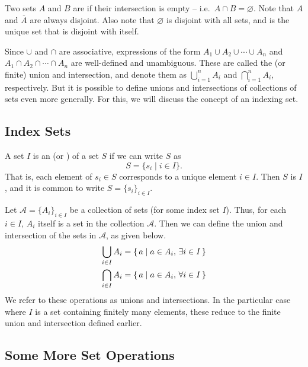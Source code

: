 Two sets $A$ and $B$ are  if their intersection is empty -- i.e.\ $A \cap B = \varnothing$. Note that $A$ and $\overline A$ are always disjoint. Also note that $\varnothing$ is disjoint with all sets, and is the unique set that is disjoint with itself.

Since $\cup$ and $\cap$ are associative, expressions of the form $A_1 \cup A_2 \cup \cdots \cup A_n$ and $A_1 \cap A_2 \cap \cdots \cap A_n$ are well-defined and unambiguous. These are called the  (or finite) union and intersection, and denote them as $\bigcup_{i=1}^n A_i$ and $\bigcap_{i=1}^n A_i$, respectively. But it is possible to define unions and intersections of collections of sets even more generally. For this, we will discuss the concept of an indexing set.

\subsection{Index Sets}\label{subsec:IndexSets}

A set $I$ is an  (or ) of a set $S$ if we can write $S$ as
\begin{equation*}
S = \{ s_i \mid i \in I\}.
\end{equation*}
That is, each element of $s_i \in S$ corresponds to a unique element $i \in I$. Then $S$ is  $I$, and it is common to write $S = \{ s_i \}_{i \in I}$.

Let $\mathcal A = \{ A_i \}_{i \in I}$ be a collection of sets (for some index set $I$). Thus, for each $i \in I$, $A_i$ itself is a set in the collection $\mathcal A$. Then we can define the union and intersection of the sets in $\mathcal A$, as given below.
\begin{align*}
\bigcup_{i \in I} A_i & = \qty{\, a \mid a \in A_i,\, \exists i \in I \,} \\
\bigcap_{i \in I} A_i & = \qty{\, a \mid a \in A_i,\, \forall i \in I \,}
\end{align*}
We refer to these operations as  unions and intersections. In the particular case where $I$ is a set containing finitely many elements, these reduce to the finite union and intersection defined earlier.

\subsection{Some More Set Operations}\label{subsec:MoreSetOps}

